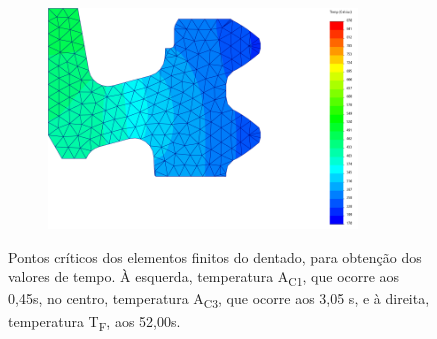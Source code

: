 \begin{figure}[htb]
\begin{subfigure}{.33\textwidth}
        \caption{}
        \label{fig:A1_Dent}
    \end{subfigure}
    \begin{subfigure}{.33\textwidth}
        \centering
        \includegraphics[width = 0.9\textwidth]{Figures/Cap4/TF_Dentado.png}
        \caption{}
        \label{fig:Tf_Dent}
    \end{subfigure}
    \caption[Pontos críticos dos elementos finitos do dentado]%
    {Pontos críticos dos elementos finitos do dentado, para obtenção dos valores de tempo. À esquerda, temperatura A\textsubscript{C1}, que ocorre aos 0,45s, no centro, temperatura A\textsubscript{C3}, que ocorre aos 3,05 s, e à direita, temperatura T\textsubscript{F}, aos 52,00s.}
    \label{fig:Dentado}
\end{figure}
